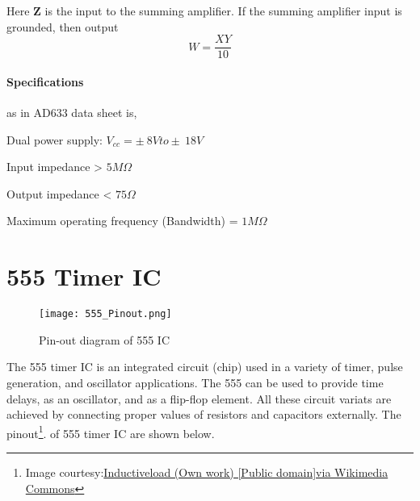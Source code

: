 Here $\textbf{Z}$ is the input to the summing amplifier. If the summing amplifier input is grounded, then output 
\begin{equation}
W=\frac{XY}{10}
\end{equation}

\paragraph{Specifications}as in AD633 data sheet is,

\noindent Dual power supply: $V_{cc}= \pm \ 8V to \pm \ 18V$

\noindent Input impedance > $5 M \Omega$

\noindent Output impedance < $75  \Omega$

\noindent Maximum operating frequency (Bandwidth) = $1 M\Omega$




\section{555 Timer IC}
\label{555}
\begin{figure}[h]
\texttt{[image: 555\_Pinout.png]}
\caption{Pin-out diagram of 555 IC}
\end{figure}
The 555 timer IC is an integrated circuit (chip) used in a variety of timer, pulse generation, and oscillator applications. The 555 can be used to provide time delays, as an oscillator, and as a flip-flop element. All these circuit variats are achieved by connecting proper values of resistors and capacitors externally.
The pinout\footnote{Image courtesy:\href{https://commons.wikimedia.org/wiki/\%3A555\_Pinout.svg}{Inductiveload (Own work) [Public domain]via Wikimedia Commons}}. %
of 555 timer IC are shown below.


